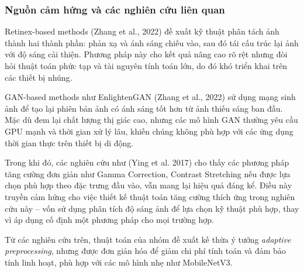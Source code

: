 \subsubsection{Nguồn cảm hứng và các nghiên cứu liên quan} %

Retinex-based methods (Zhang et al., 2022) đề xuất kỹ thuật phân tách ảnh thành hai thành phần: phản xạ và ánh sáng chiếu vào, sau đó tái cấu trúc lại ảnh với độ sáng cải thiện. Phương pháp này cho kết quả nâng cao rõ rệt nhưng đòi hỏi thuật toán phức tạp và tài nguyên tính toán lớn, do đó khó triển khai trên các thiết bị nhúng.

GAN-based methods như EnlightenGAN (Zhang et al., 2022) sử dụng mạng sinh ảnh để tạo lại phiên bản ảnh có ánh sáng tốt hơn từ ảnh thiếu sáng ban đầu. Mặc dù đem lại chất lượng thị giác cao, nhưng các mô hình GAN thường yêu cầu GPU mạnh và thời gian xử lý lâu, khiến chúng không phù hợp với các ứng dụng thời gian thực trên thiết bị di động.

Trong khi đó, các nghiên cứu như (Ying et al. 2017) cho thấy các phương pháp tăng cường đơn giản như Gamma Correction, Contrast Stretching nếu được lựa chọn phù hợp theo đặc trưng đầu vào, vẫn mang lại hiệu quả đáng kể. Điều này truyền cảm hứng cho việc thiết kế thuật toán tăng cường thích ứng trong nghiên cứu này – vốn sử dụng phân tích độ sáng ảnh để lựa chọn kỹ thuật phù hợp, thay vì áp dụng cố định một phương pháp cho mọi trường hợp.

Từ các nghiên cứu trên, thuật toán của nhóm đề xuất kế thừa ý tưởng \textit{adaptive preprocessing}, nhưng được đơn giản hóa để giảm chi phí tính toán và đảm bảo tính linh hoạt, phù hợp với các mô hình nhẹ như MobileNetV3.
